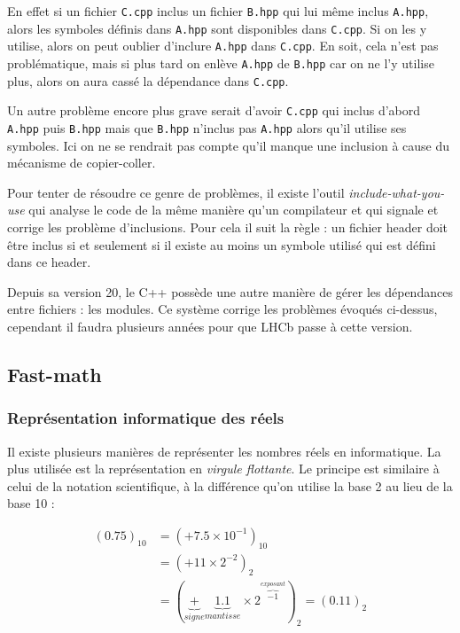\documentclass[a4paper]{report}
\begin{document}
En effet si un fichier \verb'C.cpp' inclus un fichier \verb'B.hpp' qui lui même inclus \verb'A.hpp', alors les symboles définis dans \verb'A.hpp' sont disponibles dans \verb'C.cpp'.
Si on les y utilise, alors on peut oublier d'inclure \verb'A.hpp' dans \verb'C.cpp'.
En soit, cela n'est pas problématique, mais si plus tard on enlève \verb'A.hpp' de \verb'B.hpp' car on ne l'y utilise plus, alors on aura cassé la dépendance dans \verb'C.cpp'.

Un autre problème encore plus grave serait d'avoir \verb'C.cpp' qui inclus d'abord \verb'A.hpp' puis \verb'B.hpp' mais que \verb'B.hpp' n'inclus pas \verb'A.hpp' alors qu'il utilise ses symboles.
Ici on ne se rendrait pas compte qu'il manque une inclusion à cause du mécanisme de copier-coller.

Pour tenter de résoudre ce genre de problèmes, il existe l'outil \emph{include-what-you-use} qui analyse le code de la même manière qu'un compilateur et qui signale et corrige les problème d'inclusions.
Pour cela il suit la règle : un fichier header doit être inclus si et seulement si il existe au moins un symbole utilisé qui est défini dans ce header.

Depuis sa version 20, le C++ possède une autre manière de gérer les dépendances entre fichiers : les modules.
Ce système corrige les problèmes évoqués ci-dessus, cependant il faudra plusieurs années pour que LHCb passe à cette version.

\subsection{Fast-math}

\subsubsection{Représentation informatique des réels}
Il existe plusieurs manières de représenter les nombres réels en informatique.
La plus utilisée est la représentation en \emph{virgule flottante}.
Le principe est similaire à celui de la notation scientifique, à la différence qu'on utilise la base 2 au lieu de la base 10 :

\begin{displaymath}
    \begin{split}
        (0.75)_{10} & = (+ 7.5 \times 10^{-1})_{10} \\
        & = (+11 \times 2^{-2})_{2} \\
        & = (\underbrace{+}_{signe} \underbrace{1.1}_{mantisse} \times 2^{\overbrace{-1}^{exposant}})_{2} = (0.11)_{2}
    \end{split}
\end{displaymath}
\end{document}
